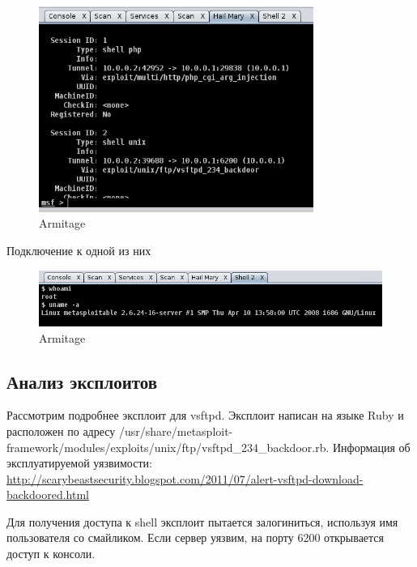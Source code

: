 \begin{figure}[H]
	\centering
	\includegraphics[width=0.8\textwidth]{images/4.png}
	\caption{Armitage}
\end{figure}

Подключение к одной из них

\begin{figure}[H]
	\centering
	\includegraphics[width=\textwidth]{images/5.png}
	\caption{Armitage}
\end{figure}

\subsection{Анализ эксплоитов}

Рассмотрим подробнее эксплоит для vsftpd. Эксплоит написан на языке Ruby и расположен по адресу /usr/share/metasploit-framework/modules/exploits/unix/ftp/vsftpd\_234\_backdoor.rb. Информация об эксплуатируемой уязвимости:
 \url{http://scarybeastsecurity.blogspot.com/2011/07/alert-vsftpd-download-backdoored.html}
 
Для получения доступа к shell эксплоит пытается залогиниться, используя имя пользователя со смайликом. Если сервер уязвим, на порту 6200 открывается доступ к консоли.

